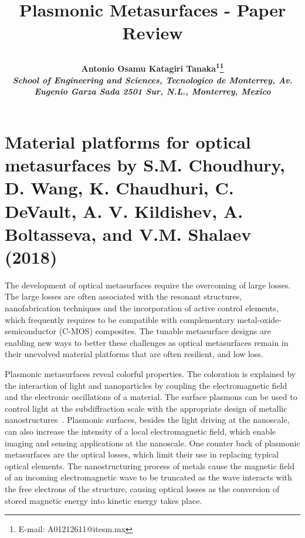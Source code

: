 \documentclass[11pt]{article}
\makeatletter
\def\NormalBaseline{\def\baselinestretch{1.1}}
\def\@shorttitle{\@empty}
\def\shorttitle#1{\gdef\@shorttitle{#1}}
\makeatother
\begin{document}
\renewcommand*\rmdefault{bch}\normalfont\upshape

\shorttitle{Plasmonic Metasurfaces - Paper Review}

\date{}  

  
\title{\NormalBaseline\raggedright\bfseries Plasmonic Metasurfaces - Paper Review}
  \let\origthanks\thanks
\renewcommand\thanks[1]{\begingroup\let\rlap\relax\origthanks{#1}\endgroup}
\author{\hskip2pc\parbox{.95\textwidth}{\bfseries\large Antonio Osamu Katagiri Tanaka\textsuperscript{1}\thanks{E-mail: A01212611@itesm.mx}
      \\[3pt] 
    \normalfont\itshape\NormalBaseline \textsuperscript{} 
    School of Engineering and Sciences\unskip, 
    Tecnologico de Monterrey\unskip, \normalfont\itshape\NormalBaseline Av. Eugenio Garza Sada 2501 Sur\unskip, N.L.\unskip, Monterrey\unskip, Mexico}}
    
    
\maketitle 
\pagestyle{custom}

    
\section{Material platforms for optical metasurfaces by S.M. Choudhury, D. Wang, K. Chaudhuri, C. DeVault, A. V. Kildishev, A. Boltasseva, and V.M. Shalaev (2018) \unskip~\protect\cite{691550:18173608}}
The development of optical metasurfaces require the overcoming of large losses. The large losses are often associated with the resonant structures, nanofabrication techniques and the incorporation of active control elements, which frequently requires to be compatible with complementary metal-oxide-semiconductor (C-MOS) composites. The tunable metasurface designs are enabling new ways to better these challenges as optical metasurfaces remain in their unevolved material platforms that are often resilient, and low loss.

Plasmonic metasurfaces reveal colorful properties. The coloration is explained by the interaction of light and nanoparticles by coupling the electromagnetic field and the electronic oscillations of a material. The surface plasmons can be used to control light at the subdiffraction scale with the appropriate design of metallic nanostructures~. Plasmonic surfaces, besides the light driving at the nanoscale, can also increase the intensity of a local electromagnetic field, which enable imaging and sensing applications at the nanoscale. One counter back of plasmonic metasurfaces are the optical losses, which limit their use in replacing typical optical elements. The nanostructuring process of metals cause the magnetic field of an incoming electromagnetic wave to be truncated as the wave interacts with the free electrons of the structure, causing optical losses as the conversion of stored magnetic energy into kinetic energy takes place.
\end{document}

